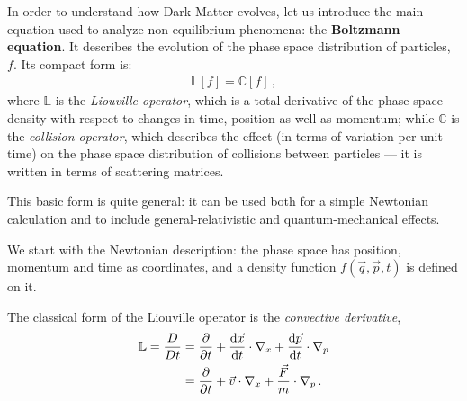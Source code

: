 \documentclass[main.tex]{subfiles}
\begin{document}





In order to understand how Dark Matter evolves, let us introduce the main equation used to analyze non-equilibrium phenomena: the \textbf{Boltzmann equation}. It describes the evolution of the phase space distribution of particles, \(f\). Its compact form is:
%
\begin{align}
  \mathbb{L} [f] = \mathbb{C} [f]
\,,
\end{align}
%
where \(\mathbb{L}\) is the \emph{Liouville operator}, which is a total derivative of the phase space density with respect to changes in time, position as well as momentum; while \(\mathbb{C}\) is the \emph{collision operator}, which describes the effect (in terms of variation per unit time) on the phase space distribution of collisions between particles --- it is written in terms of scattering matrices. 

This basic form is quite general: it can be used both for a simple Newtonian calculation and to include general-relativistic and quantum-mechanical effects.

We start with the Newtonian description: the phase space has position, momentum and time as coordinates, and a density function \(f(\vec{q}, \vec{p}, t)\) is defined on it. 


The classical form of the Liouville operator is the \emph{convective derivative},
%
\begin{subequations}
\begin{align}
  \mathbb{L} = \frac{D}{Dt} &= \pdv{}{t} + \dv{\vec{x}}{t} \cdot \nabla_x + \dv{\vec{p}}{t} \cdot \nabla_p   \\
  &= \pdv{}{t} + \vec{v} \cdot \nabla_x + \frac{\vec{F}}{m} \cdot \nabla_p 
\,. 
\end{align}
\end{subequations}
\end{document}
